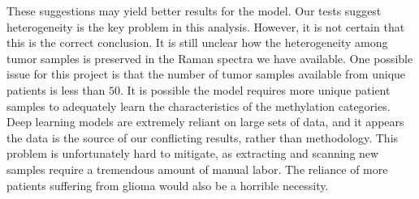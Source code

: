 These suggestions may yield better results for the model. Our tests suggest heterogeneity is the key problem in this analysis. However, it is not certain that this is the correct conclusion. It is still unclear how the heterogeneity among tumor samples is preserved in the Raman spectra we have available. One possible issue for this project is that the number of tumor samples available from unique patients is less than $50$. It is possible the model requires more unique patient samples to adequately learn the characteristics of the methylation categories. Deep learning models are extremely reliant on large sets of data, and it appears the data is the source of our conflicting results, rather than methodology. This problem is unfortunately hard to mitigate, as extracting and scanning new samples require a tremendous amount of manual labor. The reliance of more patients suffering from glioma would also be a horrible necessity.